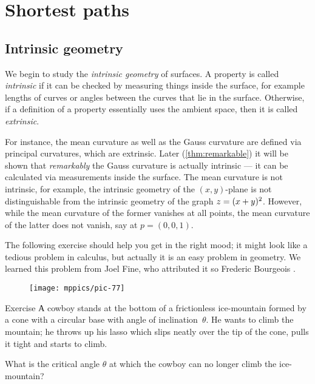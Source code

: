 \chapter{Shortest paths}
\label{chap:shortest}

\section{Intrinsic geometry}

We begin to study the \emph{intrinsic geometry} of surfaces.
A property is called \emph{intrinsic} if it can be checked by measuring things inside the surface, for example lengths of curves or angles between the curves that lie in the surface.
Otherwise, if a definition of a property essentially uses the ambient space, then it is called \emph{extrinsic}.

For instance, the mean curvature as well as the Gauss curvature are defined via principal curvatures, which are extrinsic.
Later (\ref{thm:remarkable}) it will be shown that \emph{remarkably} the Gauss curvature is actually intrinsic --- it can be calculated via measurements inside the surface.
The mean curvature is not intrinsic, for example, the intrinsic geometry of the $(x,y)$-plane is not distinguishable from the intrinsic geometry of the graph $z\z=(x+y)^2$. However,
while the mean curvature of the former vanishes at all points, the mean curvature of the latter does not vanish, say at $p=(0,0,1)$.  

The following exercise should help you get in the right mood;
it might look like a tedious problem in calculus, but actually it is an easy problem in geometry.
We learned this problem from Joel Fine, who attributed it so Frederic Bourgeois \cite{fine}.

\begin{wrapfigure}[6]{r}{33 mm}
\vskip-6mm
\centering
\texttt{[image: mppics/pic-77]}
\vskip-0mm
\end{wrapfigure}

\begin{thm}{Exercise}\label{ex:lasso}
А cowboy stands at the bottom of a frictionless ice-mountain formed by a cone with a circular base with  angle  of inclination~$\theta$.
He wants to climb the mountain;
he throws up his lasso which slips neatly over the tip of the cone, pulls it tight and starts to climb.

What is the critical angle $\theta$ at which the cowboy can no longer climb the ice-mountain?
\end{thm}

